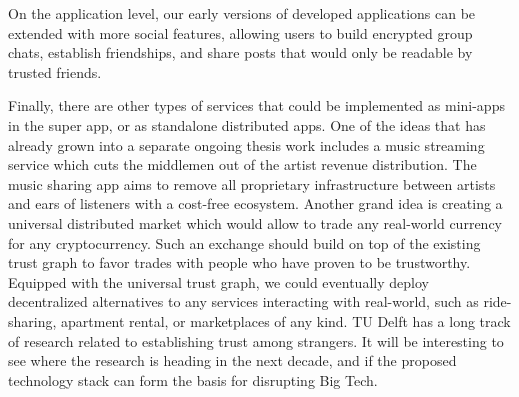 On the application level, our early versions of developed applications can be extended with more social features, allowing users to build encrypted group chats, establish friendships, and share posts that would only be readable by trusted friends.

Finally, there are other types of services that could be implemented as mini-apps in the super app, or as standalone distributed apps. One of the ideas that has already grown into a separate ongoing thesis work includes a music streaming service which cuts the middlemen out of the artist revenue distribution. The music sharing app aims to remove all proprietary infrastructure between artists and ears of listeners with a cost-free ecosystem. Another grand idea is creating a universal distributed market which would allow to trade any real-world currency for any cryptocurrency. Such an exchange should build on top of the existing trust graph to favor trades with people who have proven to be trustworthy. Equipped with the universal trust graph, we could eventually deploy decentralized alternatives to any services interacting with real-world, such as ride-sharing, apartment rental, or marketplaces of any kind. TU Delft has a long track of research related to establishing trust among strangers. It will be interesting to see where the research is heading in the next decade, and if the proposed technology stack can form the basis for disrupting Big Tech.

